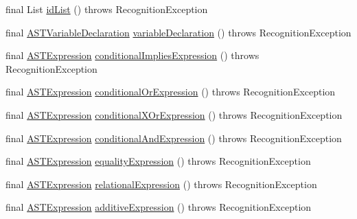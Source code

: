 \begin{DoxyCompactItemize}
final List \hyperlink{classorg_1_1tzi_1_1use_1_1parser_1_1soil_1_1_soil_parser_a13f341a101dc27bb5a200975885f628e}{id\-List} ()  throws Recognition\-Exception 
\item 
final \hyperlink{classorg_1_1tzi_1_1use_1_1parser_1_1ocl_1_1_a_s_t_variable_declaration}{A\-S\-T\-Variable\-Declaration} \hyperlink{classorg_1_1tzi_1_1use_1_1parser_1_1soil_1_1_soil_parser_a8131462f86974dcf4ada184b00d9b42d}{variable\-Declaration} ()  throws Recognition\-Exception 
\item 
final \hyperlink{classorg_1_1tzi_1_1use_1_1parser_1_1ocl_1_1_a_s_t_expression}{A\-S\-T\-Expression} \hyperlink{classorg_1_1tzi_1_1use_1_1parser_1_1soil_1_1_soil_parser_a5db30e0e417019fa9ea9e59e5b6242e1}{conditional\-Implies\-Expression} ()  throws Recognition\-Exception 
\item 
final \hyperlink{classorg_1_1tzi_1_1use_1_1parser_1_1ocl_1_1_a_s_t_expression}{A\-S\-T\-Expression} \hyperlink{classorg_1_1tzi_1_1use_1_1parser_1_1soil_1_1_soil_parser_a0e7d8e07337a4161f2e3345034fe4f37}{conditional\-Or\-Expression} ()  throws Recognition\-Exception 
\item 
final \hyperlink{classorg_1_1tzi_1_1use_1_1parser_1_1ocl_1_1_a_s_t_expression}{A\-S\-T\-Expression} \hyperlink{classorg_1_1tzi_1_1use_1_1parser_1_1soil_1_1_soil_parser_a1b2c73e3aaa69b4a04e175909966be18}{conditional\-X\-Or\-Expression} ()  throws Recognition\-Exception 
\item 
final \hyperlink{classorg_1_1tzi_1_1use_1_1parser_1_1ocl_1_1_a_s_t_expression}{A\-S\-T\-Expression} \hyperlink{classorg_1_1tzi_1_1use_1_1parser_1_1soil_1_1_soil_parser_a10085d30b1ec46e8af4e4978aef39589}{conditional\-And\-Expression} ()  throws Recognition\-Exception 
\item 
final \hyperlink{classorg_1_1tzi_1_1use_1_1parser_1_1ocl_1_1_a_s_t_expression}{A\-S\-T\-Expression} \hyperlink{classorg_1_1tzi_1_1use_1_1parser_1_1soil_1_1_soil_parser_a1163924bbe31ff92cb44992a58f2e169}{equality\-Expression} ()  throws Recognition\-Exception 
\item 
final \hyperlink{classorg_1_1tzi_1_1use_1_1parser_1_1ocl_1_1_a_s_t_expression}{A\-S\-T\-Expression} \hyperlink{classorg_1_1tzi_1_1use_1_1parser_1_1soil_1_1_soil_parser_ab451e4455735df816b175c15a88b5d8a}{relational\-Expression} ()  throws Recognition\-Exception 
\item 
final \hyperlink{classorg_1_1tzi_1_1use_1_1parser_1_1ocl_1_1_a_s_t_expression}{A\-S\-T\-Expression} \hyperlink{classorg_1_1tzi_1_1use_1_1parser_1_1soil_1_1_soil_parser_aa1036f4c13bad1d82f519b7101a19840}{additive\-Expression} ()  throws Recognition\-Exception 

\end{DoxyCompactItemize}
